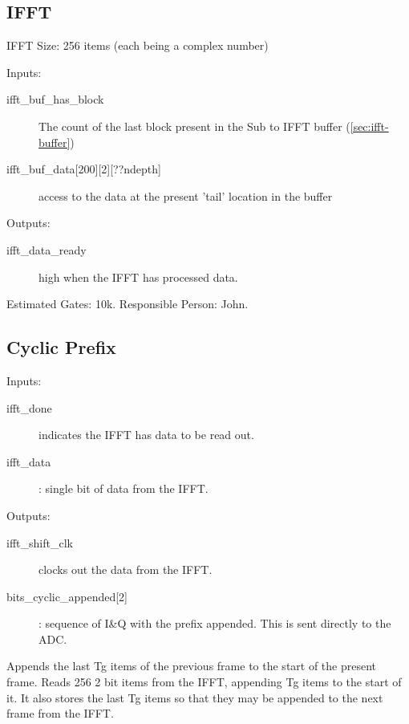 \documentclass[10pt]{article}
\begin{document}
	\subsection{IFFT}
	\label{sec:ifft}
	IFFT Size: 256 items (each being a complex number)
	\begin{description}
		\item{Inputs:}
		\begin{description}
			\item[ifft\_buf\_has\_block] The count of the last
				block present in the Sub to IFFT buffer
				(\autoref{sec:ifft-buffer})
			
			\item[ifft\_buf\_data{[200][2][??ndepth]}] access
				to the data at the present 'tail' location
				in the buffer
		\end{description}
		
		\item{Outputs:}
		\begin{description}
			\item[ifft\_data\_ready] high when the IFFT has
				processed data.
		\end{description}
	\end{description}

	Estimated Gates: 10k.
	Responsible Person: John.

	\subsection{Cyclic Prefix}
	\label{sec:cyclic_prefix}
	\begin{description}
		\item{Inputs:}
		\begin{description}
			\item[ifft\_done] indicates the IFFT has
				data to be read out.
			\item[ifft\_data] : single bit of data from
				the IFFT.
		\end{description}
		\item{Outputs:}
		\begin{description}
			\item[ifft\_shift\_clk] clocks out the data from the IFFT.
			\item[bits\_cyclic\_appended{[2]}]: sequence of
				I\&Q with the prefix appended.
				This is sent directly to the ADC.
		\end{description}
	\end{description}

	Appends the last Tg items of the previous frame to the start of the
	present frame.  Reads 256 2 bit items from the IFFT, appending Tg items
	to the start of it. It also stores the last Tg items so that they may
	be appended to the next frame from the IFFT.
\end{document}
